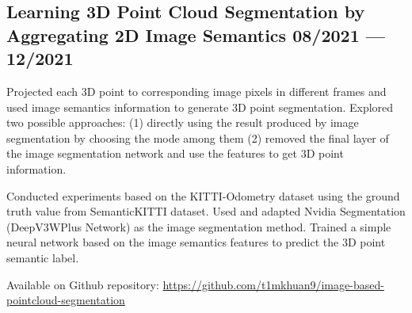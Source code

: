 \subsection{
    Learning 3D Point Cloud Segmentation by Aggregating 2D Image Semantics
    \hfill 08/2021 --- 12/2021
}
    \begin{zitemize}
        \item   Projected each 3D point to corresponding image pixels in different frames
                and used image semantics information to generate 3D point segmentation.
                Explored two possible approaches:
                (1) directly using the result produced by image segmentation by choosing
                the mode among them
                (2) removed the final layer of the image segmentation network and use the
                features to get 3D point information.
        \item   Conducted experiments based on the KITTI-Odometry dataset using the 
                ground truth value from SemanticKITTI dataset.
                Used and adapted Nvidia Segmentation (DeepV3WPlus Network) as the image
                segmentation method.
                Trained a simple neural network based on the image semantics features to
                predict the 3D point semantic label.
        \item   Available on Github repository: \url{https://github.com/t1mkhuan9/image-based-pointcloud-segmentation}
    \end{zitemize}
